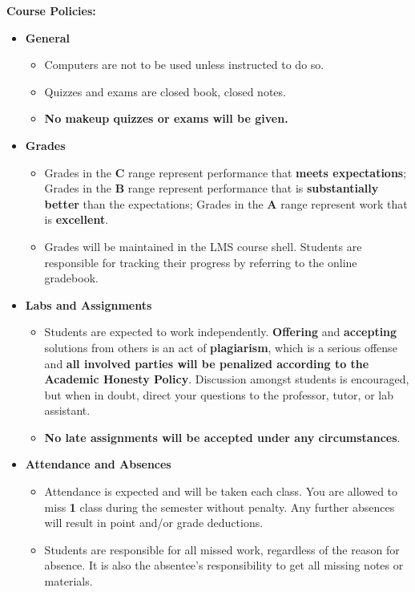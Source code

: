 \documentclass[11pt]{article}
\begin{document}
\textbf {\large Course Policies:}
\begin{itemize}
	\item \textbf {General}
		\begin{itemize}
			\item Computers are not to be used unless instructed to do so.
			\item Quizzes and exams are closed book, closed notes.
			\item \textbf {No makeup quizzes or exams will be given.}
		\end{itemize}
	\item \textbf {Grades}
		\begin{itemize}
			\item Grades in the \textbf{C} range represent performance that \textbf{meets expectations}; Grades in the \textbf{B} range represent performance that is \textbf{substantially better} than the expectations; Grades in the \textbf{A} range represent work that is \textbf{excellent}.
			\item Grades will be maintained in the LMS course shell. Students are responsible for tracking their progress by referring to the online gradebook.
		\end{itemize}
	\item \textbf {Labs and Assignments}
		\begin{itemize}
			\item Students are expected to work independently. \textbf{Offering} and \textbf{accepting} solutions from others is an act of \textbf{plagiarism}, which is a serious offense and \textbf{all involved parties will be penalized according to the Academic Honesty Policy}. Discussion amongst students is encouraged, but when in doubt, direct your questions to the professor, tutor, or lab assistant.
			\item \textbf{No late assignments will be accepted under any circumstances}.
		\end{itemize}
	\item \textbf{Attendance and Absences}
		\begin{itemize}
			\item Attendance is expected and will be taken each class. You are allowed to miss \textbf{1} class during the semester without penalty. Any further absences will result in point and/or grade deductions.
			\item Students are responsible for all missed work, regardless of the reason for absence. It is also the absentee's responsibility to get all missing notes or materials. 
		\end{itemize}
\end{itemize}
\end{document}
